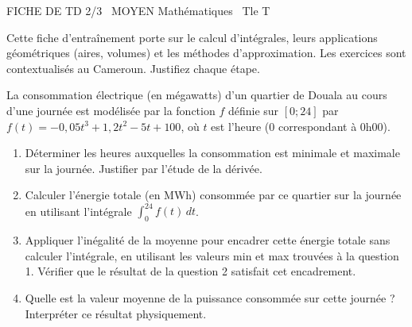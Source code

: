 \documentclass[11pt]{article}
\begin{document}
\begin{tcolorbox}[enhanced,colback=popink,colframe=popink,arc=10pt,boxrule=0pt,left=12pt,right=12pt,top=9pt,bottom=9pt]
{\color{white}\popxbold\small FICHE DE TD 2/3 \textbullet\ MOYEN \hfill Mathématiques \textbullet\ Tle T\par}
\end{tcolorbox}
\vspace{4pt}
\noindent Cette fiche d'entraînement porte sur le calcul d'intégrales, leurs applications géométriques (aires, volumes) et les méthodes d'approximation. Les exercices sont contextualisés au Cameroun. Justifiez chaque étape.

\begin{exercice}
La consommation électrique (en mégawatts) d'un quartier de Douala au cours d'une journée est modélisée par la fonction $f$ définie sur $[0; 24]$ par $f(t) = -0,05t^3 + 1,2t^2 - 5t + 100$, où $t$ est l'heure (0 correspondant à 0h00).
\begin{enumerate}
    \item Déterminer les heures auxquelles la consommation est minimale et maximale sur la journée. Justifier par l'étude de la dérivée.
    \item Calculer l'énergie totale (en MWh) consommée par ce quartier sur la journée en utilisant l'intégrale $\int_{0}^{24} f(t)\,dt$.
    \item Appliquer l'inégalité de la moyenne pour encadrer cette énergie totale sans calculer l'intégrale, en utilisant les valeurs min et max trouvées à la question 1. Vérifier que le résultat de la question 2 satisfait cet encadrement.
    \item Quelle est la valeur moyenne de la puissance consommée sur cette journée ? Interpréter ce résultat physiquement.
\end{enumerate}
\end{exercice}
\end{document}

